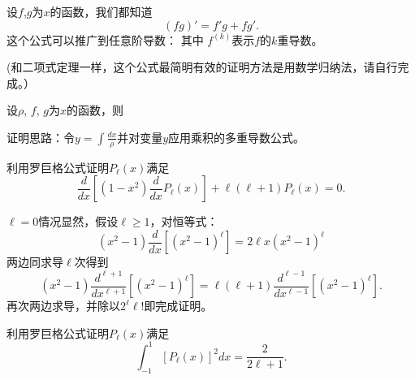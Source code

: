 \documentclass[CJK]{beamer}
\begin{document}
\begin{frame}
  \bch
  \eea
  \ech
\end{frame}



\begin{frame}
  \bch
  设$f$,$g$为$x$的函数，我们都知道
  $$ (fg)' = f'g + fg'. $$
  这个公式可以推广到任意阶导数：
  其中 $f^{(k)}$表示$f$的$k$重导数。

  \skipline
  {\small \darkgreen (和二项式定理一样，这个公式最简明有效的证明方法是用数学归纳法，请自行完成。）}
  \ech
\end{frame}


\begin{frame}
  \bch
  设$\rho$, $f$, $g$为$x$的函数，则

  \skipline
  
  {\small \darkgreen 证明思路：令$y = \int \frac{dx}{\rho}$并对变量$y$应用乘积的多重导数公式。}

  
  \ech
\end{frame}



\begin{frame}
  \bch
  
  利用罗巨格公式证明$P_\ell(x)$满足
  $$  \frac{d}{dx}\left[(1-x^2)\frac{d}{dx}P_\ell(x)\right]  + \ell(\ell+1)P_\ell(x) = 0. $$
  \ech
\end{frame}


\begin{frame}
  \bch
  $\ell=0$情况显然，假设$\ell\ge 1$，对恒等式：
  $$(x^2-1) \frac{d}{dx} \left[(x^2-1)^\ell\right] = 2\ell x (x^2-1)^\ell $$
  两边同求导$\ell$次得到
  $$(x^2-1)\frac{d^{\ell+1}}{dx^{\ell+1}} \left[(x^2-1)^\ell\right] =\ell(\ell+1) \frac{d^{\ell-1}}{dx^{\ell-1}} \left[(x^2-1)^\ell\right]. $$
  再次两边求导，并除以$2^\ell \ell !$即完成证明。

  
  \ech
\end{frame}



\begin{frame}
  \bch
  
  利用罗巨格公式证明$P_\ell(x)$满足
  $$\int_{-1}^1 \left[P_\ell(x)\right]^2 dx = \frac{2}{2\ell+1}. $$
  \ech
\end{frame}
\end{document}
